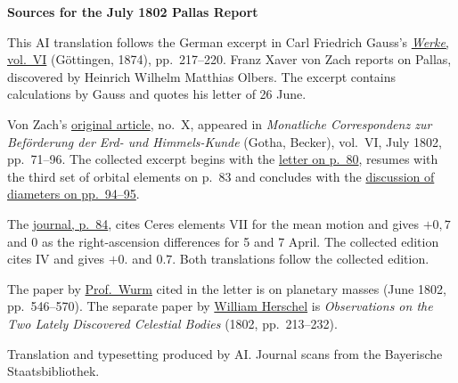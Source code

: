 \clearpage\thispagestyle{empty}
\begin{center}\textbf{Sources for the July 1802 Pallas Report}\end{center}
\noindent This AI translation follows the German excerpt in Carl Friedrich Gauss’s \href{https://gdz.sub.uni-goettingen.de/id/PPN236007467}{\textit{Werke}, vol.~VI} (Göttingen, 1874), pp.~217--220. Franz Xaver von Zach reports on Pallas, discovered by Heinrich Wilhelm Matthias Olbers. The excerpt contains calculations by Gauss and quotes his letter of 26 June.
\par\smallskip\noindent Von Zach’s \href{https://api.digitale-sammlungen.de/iiif/image/v2/bsb10538598_00077/full/1450,/0/default.jpg}{original article}, no.~X, appeared in \textit{Monatliche Correspondenz zur Beförderung der Erd- und Himmels-Kunde} (Gotha, Becker), vol.~VI, July 1802, pp.~71--96. The collected excerpt begins with the \href{https://api.digitale-sammlungen.de/iiif/image/v2/bsb10538598_00086/full/1450,/0/default.jpg}{letter on p.~80}, resumes with the third set of orbital elements on p.~83 and concludes with the \href{https://api.digitale-sammlungen.de/iiif/image/v2/bsb10538598_00100/full/1450,/0/default.jpg}{discussion of diameters on pp.~94--95}.
\par\smallskip\noindent The \href{https://api.digitale-sammlungen.de/iiif/image/v2/bsb10538598_00090/full/1450,/0/default.jpg}{journal, p.~84}, cites Ceres elements VII for the mean motion and gives \(+0{,}7\) and \(0\) as the right-ascension differences for 5 and 7 April. The collected edition cites IV and gives \(+0.\) and \(0.7\). Both translations follow the collected edition.
\par\smallskip\noindent The paper by \href{https://api.digitale-sammlungen.de/iiif/image/v2/bsb10538597_00562/full/1450,/0/default.jpg}{Prof.\ Wurm} cited in the letter is on planetary masses (June 1802, pp.~546--570). The separate paper by \href{https://doi.org/10.1098/rstl.1802.0010}{William Herschel} is \textit{Observations on the Two Lately Discovered Celestial Bodies} (1802, pp.~213--232).
\par\smallskip\noindent Translation and typesetting produced by AI. Journal scans from the Bayerische Staatsbibliothek.
\clearpage

